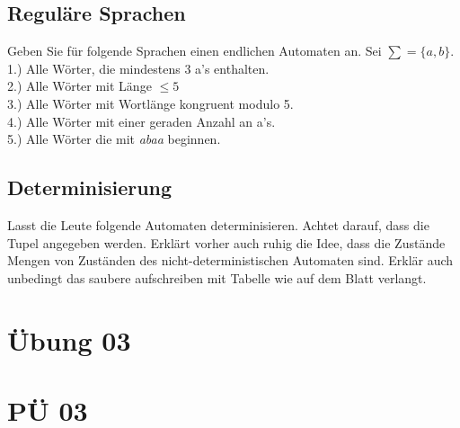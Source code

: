 \documentclass[paper=a4, fontsize=11pt]{scrartcl}
\numberwithin{equation}{section}
\numberwithin{figure}{section}
\numberwithin{table}{section}
\begin{document}

\subsection{Reguläre Sprachen}

Geben Sie für folgende Sprachen einen endlichen Automaten an. Sei $\sum = \{ a,b \}$. \\

1.) Alle Wörter, die mindestens 3 a's enthalten. \\

2.) Alle Wörter mit Länge $\leq 5$ \\

3.) Alle Wörter mit Wortlänge kongruent modulo 5. \\

4.) Alle Wörter mit einer geraden Anzahl an a's. \\

5.) Alle Wörter die mit \emph{abaa} beginnen. \\


\subsection{Determinisierung}

Lasst die Leute folgende Automaten determinisieren. Achtet darauf, dass die Tupel angegeben werden. Erklärt vorher auch ruhig die Idee, dass die Zustände Mengen von Zuständen des nicht-deterministischen Automaten sind. Erklär auch unbedingt das saubere aufschreiben mit Tabelle wie auf dem Blatt verlangt.


\newpage

\section{Übung 03}


\newpage

\section{PÜ 03}
\end{document}
